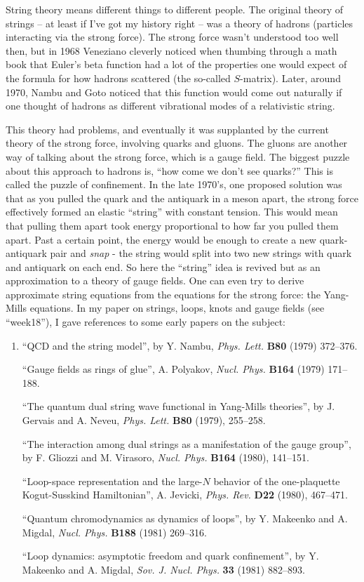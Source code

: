 \documentclass{article}
\begin{document}
String theory means different things to different people. The original
theory of strings -- at least if I've got my history right -- was a
theory of hadrons (particles interacting via the strong force). The
strong force wasn't understood too well then, but in 1968 Veneziano
cleverly noticed when thumbing through a math book that Euler's beta
function had a lot of the properties one would expect of the formula for
how hadrons scattered (the so-called \(S\)-matrix). Later, around 1970,
Nambu and Goto noticed that this function would come out naturally if
one thought of hadrons as different vibrational modes of a relativistic
string.

This theory had problems, and eventually it was supplanted by the
current theory of the strong force, involving quarks and gluons. The
gluons are another way of talking about the strong force, which is a
gauge field. The biggest puzzle about this approach to hadrons is, ``how
come we don't see quarks?'' This is called the puzzle of confinement. In
the late 1970's, one proposed solution was that as you pulled the quark
and the antiquark in a meson apart, the strong force effectively formed
an elastic ``string'' with constant tension. This would mean that
pulling them apart took energy proportional to how far you pulled them
apart. Past a certain point, the energy would be enough to create a new
quark-antiquark pair and \emph{snap} - the string would split into two
new strings with quark and antiquark on each end. So here the ``string''
idea is revived but as an approximation to a theory of gauge fields. One
can even try to derive approximate string equations from the equations
for the strong force: the Yang-Mills equations. In my paper on strings,
loops, knots and gauge fields (see ``week18''), I gave references to
some early papers on the subject:

\begin{enumerate}
\def\labelenumi{\arabic{enumi})}
\item
  ``QCD and the string model'', by Y. Nambu, \emph{Phys. Lett.}
  \textbf{B80} (1979) 372--376.

  ``Gauge fields as rings of glue'', A. Polyakov, \emph{Nucl. Phys.}
  \textbf{B164} (1979) 171--188.

  ``The quantum dual string wave functional in Yang-Mills theories'', by
  J. Gervais and A. Neveu, \emph{Phys. Lett.} \textbf{B80} (1979),
  255--258.

  ``The interaction among dual strings as a manifestation of the gauge
  group'', by F. Gliozzi and M. Virasoro, \emph{Nucl. Phys.}
  \textbf{B164} (1980), 141--151.

  ``Loop-space representation and the large-\(N\) behavior of the
  one-plaquette Kogut-Susskind Hamiltonian'', A. Jevicki, \emph{Phys.
  Rev.} \textbf{D22} (1980), 467--471.

  ``Quantum chromodynamics as dynamics of loops'', by Y. Makeenko and A.
  Migdal, \emph{Nucl. Phys.} \textbf{B188} (1981) 269--316.

  ``Loop dynamics: asymptotic freedom and quark confinement'', by Y.
  Makeenko and A. Migdal, \emph{Sov. J. Nucl. Phys.} \textbf{33} (1981)
  882--893.
\end{enumerate}
\end{document}
